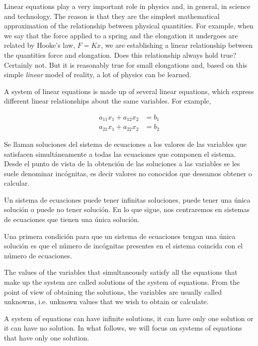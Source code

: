 \begin{paracol}{2}
Linear equations play a very important role in physics and, in general, in science and technology. The reason is that they are the simplest mathematical approximation of the relationship between physical quantities. For example, when we say that the force applied to a spring and the elongation it undergoes are related by Hooke's law, $F=Kx$, we are establishing a linear relationship between the quantities force and elongation. Does this relationship always hold true? Certainly not. But it is reasonably true for small elongations and, based on this simple \emph{linear} model of reality, a lot of physics can be learned.

A system of linear equations is made up of several linear equations, which express different linear relationships about the same variables. For example,

\begin{align*}
a_{11}x_1+a_{12}x_2&=b_1\\
a_{21}x_1+a_{22}x_2&=b_2
\end{align*}

\switchcolumn

Se llaman soluciones del sistema de ecuaciones a los valores de las variables que satisfacen simultáneamente a todas las ecuaciones que componen el sistema. Desde el punto de vista de la obtención de las soluciones a las variables se les suele denominar incógnitas, es decir valores no conocidos que deseamos obtener o calcular.

Un sistema de ecuaciones puede tener infinitas soluciones, puede tener una única solución o puede no tener solución. En lo que sigue, nos centraremos en sistemas de ecuaciones que tienen una única solución. 

Una primera condición para que un sistema de ecuaciones tengan una única solución es que el número de incógnitas presentes en el sistema coincida con el número de ecuaciones. 

\switchcolumn

The values of the variables that simultaneously satisfy all the equations that make up the system are called solutions of the system of equations. From the point of view of obtaining the solutions, the variables are usually called unknowns, i.e. unknown values that we wish to obtain or calculate.

A system of equations can have infinite solutions, it can have only one solution or it can have no solution. In what follows, we will focus on systems of equations that have only one solution. 


\end{paracol}

